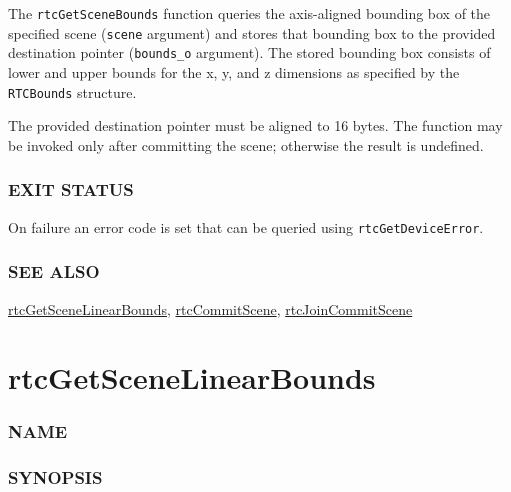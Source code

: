 The \texttt{rtcGetSceneBounds} function queries the axis-aligned
bounding box of the specified scene (\texttt{scene} argument) and stores
that bounding box to the provided destination pointer
(\texttt{bounds\_o} argument). The stored bounding box consists of lower
and upper bounds for the x, y, and z dimensions as specified by the
\texttt{RTCBounds} structure.

The provided destination pointer must be aligned to 16 bytes. The
function may be invoked only after committing the scene; otherwise the
result is undefined.

\subsubsection{EXIT STATUS}\label{exit-status}

On failure an error code is set that can be queried using
\texttt{rtcGetDeviceError}.

\subsubsection{SEE ALSO}\label{see-also}

\hyperref[rtcgetscenelinearbounds]{rtcGetSceneLinearBounds},
\hyperref[rtccommitscene]{rtcCommitScene},
\hyperref[rtcjoincommitscene]{rtcJoinCommitScene}

\pagebreak

\section{rtcGetSceneLinearBounds}\label{rtcgetscenelinearbounds}

\subsubsection{NAME}\label{name}

\begin{Shaded}
\begin{Highlighting}[]
\OperatorTok{{-}}
\end{Highlighting}
\end{Shaded}

\subsubsection{SYNOPSIS}\label{synopsis}


